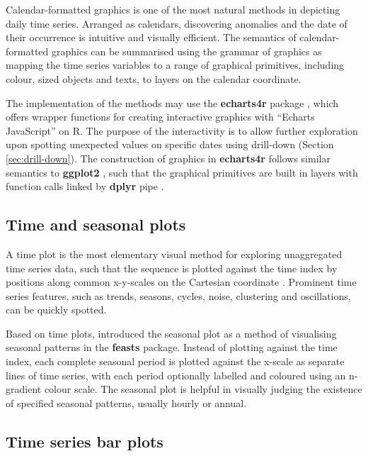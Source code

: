 \documentclass{aucklandthesis}
\begin{document}
Calendar-formatted graphics is one of the most natural methods in depicting daily time series. Arranged as calendars, discovering anomalies and the date of their occurrence is intuitive and visually efficient. The semantics of calendar-formatted graphics can be summarised using the grammar of graphics \autocite{grammar} as mapping the time series variables to a range of graphical primitives, including colour, sized objects and texts, to layers on the calendar coordinate.

The implementation of the methods may use the \textbf{echarts4r} package \autocite{echarts4r}, which offers wrapper functions for creating interactive graphics with ``Echarts JavaScript'' \autocite{echarts} on R. The purpose of the interactivity is to allow further exploration upon spotting unexpected values on specific dates using drill-down (Section \ref{sec:drill-down}). The construction of graphics in \textbf{echarts4r} follows similar semantics to \textbf{ggplot2} \autocite{ggplot2}, such that the graphical primitives are built in layers with function calls linked by \textbf{dplyr} pipe \autocite{dplyr}.

\hypertarget{time-and-seasonal-plots}{%
\subsection{Time and seasonal plots}\label{time-and-seasonal-plots}}

A time plot is the most elementary visual method for exploring unaggregated time series data, such that the sequence is plotted against the time index by positions along common x-y-scales on the Cartesian coordinate \autocite{fpp3}. Prominent time series features, such as trends, seasons, cycles, noise, clustering and oscillations, can be quickly spotted.

Based on time plots, \textcite{feasts} introduced the seasonal plot as a method of visualising seasonal patterns in the \textbf{feasts} package. Instead of plotting against the time index, each complete seasonal period is plotted against the x-scale as separate lines of time series, with each period optionally labelled and coloured using an n-gradient colour scale. The seasonal plot is helpful in visually judging the existence of specified seasonal patterns, usually hourly or annual.

\hypertarget{sec:ts-plot}{%
\subsection{Time series bar plots}\label{sec:ts-plot}}
\end{document}
